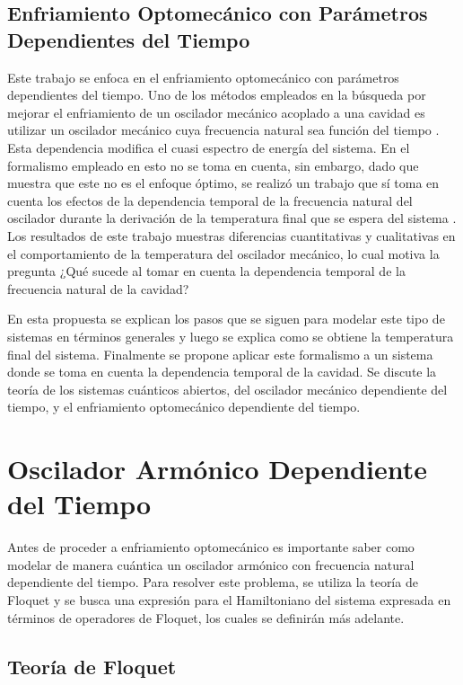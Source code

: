 \documentclass[10pt,a4paper]{report}
\begin{document}
\section{Enfriamiento Optomecánico con Parámetros Dependientes del Tiempo}

Este trabajo se enfoca en el enfriamiento optomecánico con parámetros dependientes del tiempo. Uno de los métodos empleados en la búsqueda por mejorar el enfriamiento de un oscilador mecánico acoplado a una cavidad es utilizar un oscilador mecánico cuya frecuencia natural sea función del tiempo \cite{BarberisLC}. Esta dependencia modifica el cuasi espectro de energía del sistema\cite{HanngiFM}. En el formalismo empleado en \cite{BarberisLC} esto no se toma en cuenta, sin embargo, dado que \cite{HanngiFM} muestra que este no es el enfoque óptimo, se realizó un trabajo que sí toma en cuenta los efectos de la dependencia temporal de la frecuencia natural del oscilador durante la derivación  de la temperatura final que se espera del sistema \cite{YanesOC}. Los resultados de este trabajo muestras diferencias cuantitativas y cualitativas en el comportamiento de la temperatura del oscilador mecánico, lo cual motiva la pregunta ¿Qué sucede al tomar en cuenta la dependencia temporal de la frecuencia natural de la cavidad? 

En esta propuesta se explican los pasos que se siguen para modelar este tipo de sistemas en términos generales y luego se explica como se obtiene la temperatura final del sistema. Finalmente se propone aplicar este formalismo a un sistema donde se toma en cuenta la dependencia temporal de la cavidad. Se discute la teoría de los sistemas cuánticos abiertos, del oscilador mecánico dependiente del tiempo, y el enfriamiento optomecánico dependiente del tiempo.




\chapter{Oscilador Armónico Dependiente del Tiempo}

Antes de proceder a enfriamiento optomecánico es importante saber como modelar de manera cuántica un oscilador armónico con frecuencia natural dependiente del tiempo. Para resolver este problema, se utiliza la teoría de Floquet \cite{WardFT} y se busca una expresión para el Hamiltoniano del sistema expresada en términos de operadores de Floquet, los cuales se definirán más adelante.

\section{Teoría de Floquet}
\end{document}
